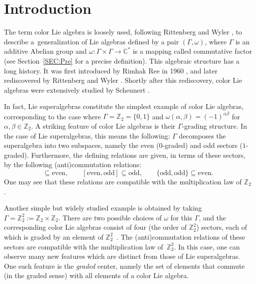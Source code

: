 \documentclass[pdftex]{sigma}
\numberwithin{equation}{section}
\theoremstyle{definition}
\def\Z2{\mathbb{Z}_2^2}
\begin{document}


\section{Introduction}

The term color Lie algebra is loosely used, following Rittenberg and Wyler \cite{rw2}, to describe a~generalization of Lie algebras defined by a pair $(\Gamma,\omega)$, where $\Gamma $ is an additive Abelian group and $\omega\colon \Gamma \times \Gamma \to \mathbb{C}^*$ is a mapping called commutative factor (see Section~\ref{SEC:Pre} for a precise definition). This algebraic structure has a long history. It was first introduced by Rimhak Ree in 1960 \cite{Ree}, and later rediscovered by Rittenberg and Wyler \cite{rw1,rw2}. Shortly after this rediscovery, color Lie algebras were extensively studied by Scheunert \cite{scheu,scheuCasi,scheuTen}.

In fact, Lie superalgebras constitute the simplest example of color Lie algebras, corresponding to the case where $\Gamma = \mathbb{Z}_2 = \{ 0, 1 \}$ and $ \omega(\alpha,\beta) =(-1)^{\alpha\beta}$ for $ \alpha,\beta \in \mathbb{Z}_2$.
A striking feature of color Lie algebras is their $\Gamma$-grading structure.
In the case of Lie superalgebras, this means the following: $\Gamma$ decomposes the superalgebra into two subspaces, namely the even ($0$-graded) and odd sectors ($1$-graded).
Furthermore, the defining relations are given, in terms of these sectors, by the following (anti)commutation relations:
\begin{equation*}
	[\mathrm{even}, \mathrm{even}] \subseteq \mathrm{even}, \qquad
	[\mathrm{even},\mathrm{odd}] \subseteq \mathrm{odd}, \qquad
	\{ \mathrm{odd}, \mathrm{odd}\} \subseteq \mathrm{even}.
\end{equation*}
One may see that these relations are compatible with the multiplication law of $\mathbb{Z}_2$.

Another simple but widely studied example is obtained by taking $\Gamma = \Z2 := \mathbb{Z}_2 \times \mathbb{Z}_2$. There are two possible choices of $\omega$ for this $\Gamma$, and the corresponding color Lie algebras consist of four (the order of $\Z2$) sectors, each of which is graded by an element of $\Z2$~\cite{rw2}.
The (anti)commutation relations of these sectors are compatible with the multiplication law of~$\Z2$.
In this case, one can observe many new features which are distinct from those of Lie superalgebras.
One such feature is the \textit{graded} center, namely the set of elements that commute (in the graded sense) with all elements of a color Lie algebra.
\end{document}
